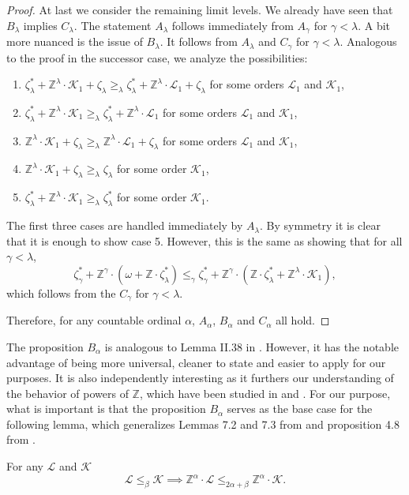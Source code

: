 \documentclass{amsart}
\newcommand{\Z}{\mathbb{Z}}
\newcommand{\K}{\mathcal{K}}
\renewcommand{\L}{\mathcal{L}}
\begin{document}
\begin{proof}
At last we consider the remaining limit levels. We already have seen that
$B_\lambda$ implies $C_\lambda$. The statement $A_\lambda$ follows immediately from $A_\gamma$ for $\gamma<\lambda$. 
A bit more nuanced is the issue of $B_\lambda$. It follows from $A_\lambda$ and $C_\gamma$ for $\gamma<\lambda$.
Analogous to the proof in the successor case, we analyze the possibilities:
\begin{enumerate}
\item $\zeta^*_{\lambda} +\Z^{\lambda}\cdot
    \K_1+\zeta_{\lambda}\geq_\lambda \zeta^*_{\lambda} +\Z^{\lambda}\cdot \L_1+\zeta_{\lambda} $ for some orders $\L_1$ and $\K_1$,
\item $\zeta^*_{\lambda} +\Z^{\lambda}\cdot \K_1\geq_\lambda \zeta^*_{\lambda} +\Z^{\lambda}\cdot \L_1 $ for some orders $\L_1$ and $\K_1$,
\item $\Z^{\lambda}\cdot \K_1+\zeta_{\lambda}\geq_\lambda \Z^{\lambda}\cdot \L_1+\zeta_{\lambda} $ for some orders $\L_1$ and $\K_1$,
\item $\Z^{\lambda}\cdot \K_1+\zeta_{\lambda}\geq_\lambda \zeta_{\lambda} $ for some order $\K_1$,
\item $\zeta^*_{\lambda} +\Z^{\lambda}\cdot \K_1\geq_\lambda\zeta^*_{\lambda} $ for some order $\K_1$.
\end{enumerate}

The first three cases are handled immediately by $A_{\lambda}$. By symmetry it is clear that it is enough to show case 5. However, this is the same as showing that for all $\gamma<\lambda$,
$$\zeta_{\gamma}^* + \Z^\gamma\cdot(\omega +  \Z\cdot\zeta_{\lambda}^*)
\leq_{\gamma}\zeta_{\gamma}^* + \Z^{\gamma}\cdot
(\Z\cdot\zeta_{\lambda}^*+\Z^\lambda\cdot \K_1),$$
which follows from the $C_\gamma$ for $\gamma<\lambda$.

Therefore, for any countable ordinal $\alpha$, $A_\alpha$, $B_\alpha$ and $C_\alpha$ all hold.
\end{proof}

The proposition $B_\alpha$ is analogous to Lemma II.38 in \cite{montalban2021}.
However, it has the notable advantage of being more universal, cleaner to state
and easier to apply for our purposes. It is also independently interesting as it
furthers our understanding of the behavior of powers of $\Z$, which have been
studied in \cite{GHKMMS} and \cite{Ash91}. For our purpose, what is important is
that the proposition $B_\alpha$ serves as the base case for the following lemma,
which generalizes Lemmas 7.2 and 7.3 from \cite{GHKMMS} and proposition 4.8 from \cite{Ash91}.
\begin{lemma}\label{lem:zpowersbfpreserve}
For any $\L$ and $\K$
$$\L\leq_\beta \K\implies \Z^\alpha\cdot \L\leq_{2\alpha+\beta} \Z^\alpha\cdot \K.$$
\end{lemma}
\end{document}
